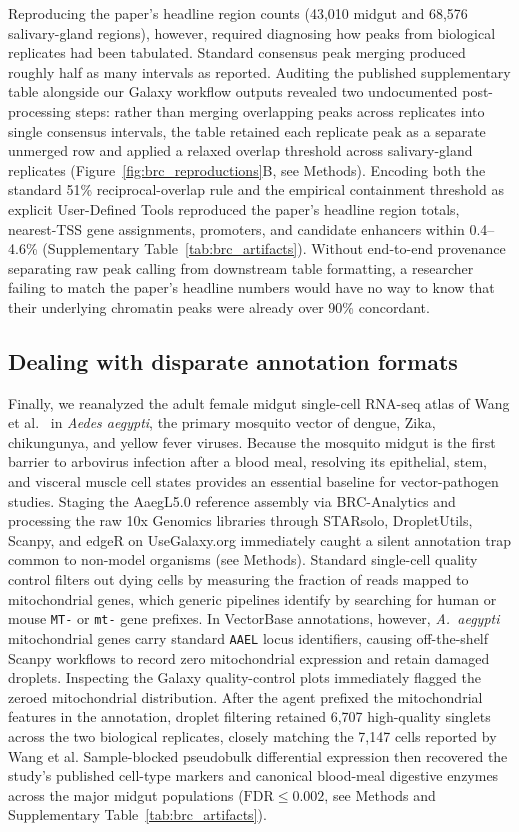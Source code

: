 \documentclass[11pt,letterpaper]{article}
\begin{document}
Reproducing the paper's headline region counts (43,010 midgut and 68,576 salivary-gland regions), however, required diagnosing how peaks from biological replicates had been tabulated. Standard consensus peak merging produced roughly half as many intervals as reported. Auditing the published supplementary table alongside our Galaxy workflow outputs revealed two undocumented post-processing steps: rather than merging overlapping peaks across replicates into single consensus intervals, the table retained each replicate peak as a separate unmerged row and applied a relaxed overlap threshold across salivary-gland replicates (Figure~\ref{fig:brc_reproductions}B, see Methods). Encoding both the standard 51\% reciprocal-overlap rule and the empirical containment threshold as explicit User-Defined Tools reproduced the paper's headline region totals, nearest-TSS gene assignments, promoters, and candidate enhancers within 0.4--4.6\% (Supplementary Table~\ref{tab:brc_artifacts}). Without end-to-end provenance separating raw peak calling from downstream table formatting, a researcher failing to match the paper's headline numbers would have no way to know that their underlying chromatin peaks were already over 90\% concordant.

\subsection{Dealing with disparate annotation formats}

Finally, we reanalyzed the adult female midgut single-cell RNA-seq atlas of Wang et al.\ \cite{wang2024} in \textit{Aedes aegypti}, the primary mosquito vector of dengue, Zika, chikungunya, and yellow fever viruses. Because the mosquito midgut is the first barrier to arbovirus infection after a blood meal, resolving its epithelial, stem, and visceral muscle cell states provides an essential baseline for vector-pathogen studies. Staging the AaegL5.0 reference assembly via BRC-Analytics and processing the raw 10x Genomics libraries through STARsolo, DropletUtils, Scanpy, and edgeR on UseGalaxy.org immediately caught a silent annotation trap common to non-model organisms (see Methods). Standard single-cell quality control filters out dying cells by measuring the fraction of reads mapped to mitochondrial genes, which generic pipelines identify by searching for human or mouse \texttt{MT-} or \texttt{mt-} gene prefixes. In VectorBase annotations, however, \textit{A.\ aegypti} mitochondrial genes carry standard \texttt{AAEL} locus identifiers, causing off-the-shelf Scanpy workflows to record zero mitochondrial expression and retain damaged droplets. Inspecting the Galaxy quality-control plots immediately flagged the zeroed mitochondrial distribution. After the agent prefixed the mitochondrial features in the annotation, droplet filtering retained 6,707 high-quality singlets across the two biological replicates, closely matching the 7,147 cells reported by Wang et al. Sample-blocked pseudobulk differential expression then recovered the study's published cell-type markers and canonical blood-meal digestive enzymes across the major midgut populations ($\text{FDR} \le 0.002$, see Methods and Supplementary Table~\ref{tab:brc_artifacts}).
\end{document}
